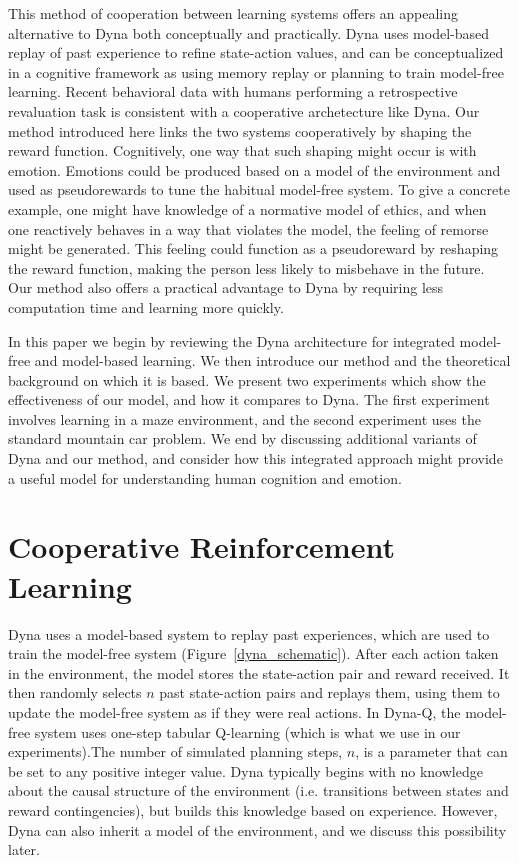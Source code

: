 \documentclass[letterpaper]{article}
\begin{document}
This method of cooperation between learning systems offers an appealing alternative to Dyna both conceptually and practically. Dyna uses model-based replay of past experience to refine state-action values, and can be conceptualized in a cognitive framework as using memory replay or planning to train model-free learning. Recent behavioral data with humans performing a retrospective revaluation task is consistent with a cooperative archetecture like Dyna. Our method introduced here links the two systems cooperatively by shaping the reward function. Cognitively, one way that such shaping might occur is with emotion. Emotions could be produced based on a model of the environment and used as pseudorewards to tune the habitual model-free system. To give a concrete example, one might have knowledge of a normative model of ethics, and when one reactively behaves in a way that violates the model, the feeling of remorse might be generated. This feeling could function as a pseudoreward by reshaping the reward function, making the person less likely to misbehave in the future. Our method also offers a practical advantage to Dyna by requiring less computation time and learning more quickly.

In this paper we begin by reviewing the Dyna architecture for integrated model-free and model-based learning. We then introduce our method and the theoretical background on which it is based. We present two experiments which show the effectiveness of our model, and how it compares to Dyna. The first experiment involves learning in a maze environment, and the second experiment uses the standard mountain car problem. We end by discussing additional variants of Dyna and our method, and consider how this integrated approach might provide a useful model for understanding human cognition and emotion.

\section{Cooperative Reinforcement Learning}

Dyna uses a model-based system to replay past experiences, which are used to train the model-free system (Figure~\ref{dyna_schematic}). After each action taken in the environment, the model stores the state-action pair and reward received. It then randomly selects $n$ past state-action pairs and replays them, using them to update the model-free system as if they were real actions. In Dyna-Q, the model-free system uses one-step tabular Q-learning (which is what we use in our experiments).The number of simulated planning steps, $n$, is a parameter that can be set to any positive integer value. Dyna typically begins with no knowledge about the causal structure of the environment (i.e. transitions between states and reward contingencies), but builds this knowledge based on experience. However, Dyna can also inherit a model of the environment, and we discuss this possibility later.
\end{document}
